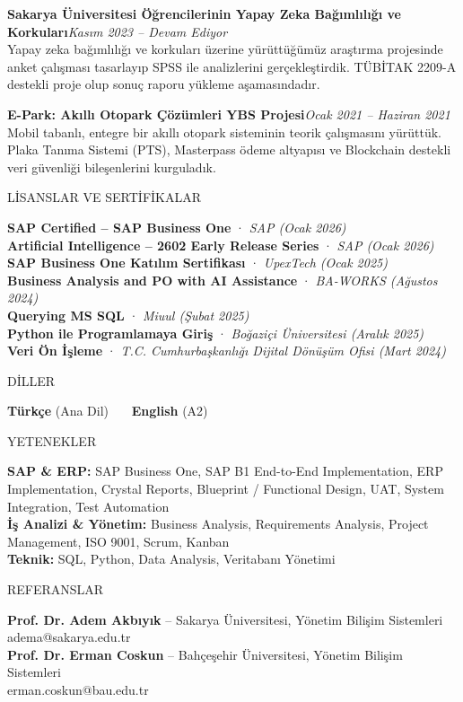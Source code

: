 \documentclass[a4paper,8pt]{extarticle}
\newcommand{\cvsection}[1]{%
  \vspace{4pt}%
  \noindent\colorbox{cvbluelight}{\parbox{\dimexpr\textwidth-2\fboxsep}{\color{cvblue}\bfseries\strut #1\strut}}%
  \par\vspace{2pt}%
}
\begin{document}
\vspace{2pt}
\textbf{Sakarya Üniversitesi Öğrencilerinin Yapay Zeka Bağımlılığı ve Korkuları}\hfill{\small\textit{Kasım 2023 -- Devam Ediyor}}\\
{\small Yapay zeka bağımlılığı ve korkuları üzerine yürüttüğümüz araştırma projesinde anket çalışması tasarlayıp SPSS ile analizlerini gerçekleştirdik. TÜBİTAK 2209-A destekli proje olup sonuç raporu yükleme aşamasındadır.}

\vspace{2pt}
\textbf{E-Park: Akıllı Otopark Çözümleri YBS Projesi}\hfill{\small\textit{Ocak 2021 -- Haziran 2021}}\\
{\small Mobil tabanlı, entegre bir akıllı otopark sisteminin teorik çalışmasını yürüttük. Plaka Tanıma Sistemi (PTS), Masterpass ödeme altyapısı ve Blockchain destekli veri güvenliği bileşenlerini kurguladık.}

\cvsection{LİSANSLAR VE SERTİFİKALAR}
{\small
\textbf{SAP Certified -- SAP Business One} · \textit{SAP (Ocak 2026)}\\
\textbf{Artificial Intelligence -- 2602 Early Release Series} · \textit{SAP (Ocak 2026)}\\
\textbf{SAP Business One Katılım Sertifikası} · \textit{UpexTech (Ocak 2025)}\\
\textbf{Business Analysis and PO with AI Assistance} · \textit{BA-WORKS (Ağustos 2024)}\\
\textbf{Querying MS SQL} · \textit{Miuul (Şubat 2025)}\\
\textbf{Python ile Programlamaya Giriş} · \textit{Boğaziçi Üniversitesi (Aralık 2025)}\\
\textbf{Veri Ön İşleme} · \textit{T.C. Cumhurbaşkanlığı Dijital Dönüşüm Ofisi (Mart 2024)}
}

\cvsection{DİLLER}
{\small \textbf{Türkçe} (Ana Dil) \ \textbullet\ \ \textbf{English} (A2)}

\cvsection{YETENEKLER}
{\small
\textbf{SAP \& ERP:} SAP Business One, SAP B1 End-to-End Implementation, ERP Implementation, Crystal Reports, Blueprint / Functional Design, UAT, System Integration, Test Automation\\
\textbf{İş Analizi \& Yönetim:} Business Analysis, Requirements Analysis, Project Management, ISO 9001, Scrum, Kanban\\
\textbf{Teknik:} SQL, Python, Data Analysis, Veritabanı Yönetimi
}

\cvsection{REFERANSLAR}
{\small
\textbf{Prof. Dr. Adem Akbıyık} -- Sakarya Üniversitesi, Yönetim Bilişim Sistemleri\\
adema@sakarya.edu.tr\\[2pt]
\textbf{Prof. Dr. Erman Coskun} -- Bahçeşehir Üniversitesi, Yönetim Bilişim Sistemleri\\
erman.coskun@bau.edu.tr
}
\end{document}
